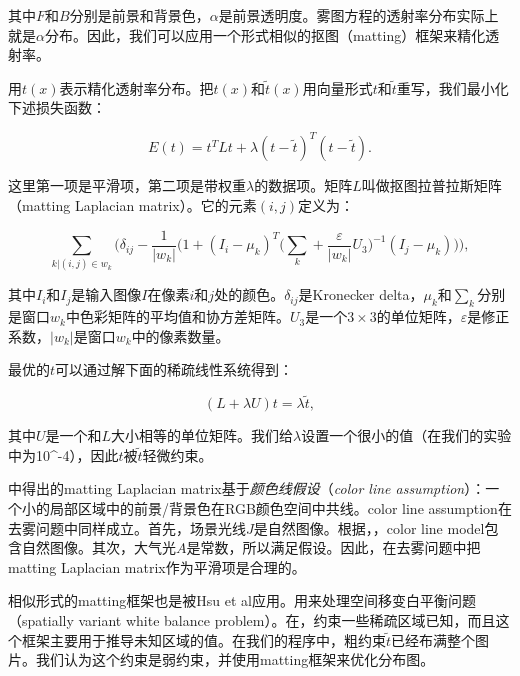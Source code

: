 \documentclass{ctexart}
\begin{document}
其中$F$和$B$分别是前景和背景色，$\alpha$是前景透明度。雾图方程的透射率分布实际上就是$\alpha$分布。因此，我们可以应用一个形式相似的抠图（matting）\cite{LevinLischinskiWeiss2006}框架来精化透射率。\par

用$t(x)$表示精化透射率分布。把$t(x)$和$\tilde{t}(x)$用向量形式$t$和$\tilde{t}$重写，我们最小化下述损失函数：

\begin{equation}\label{equ:15}
	E(t) = t^TLt + \lambda(t-\tilde{t})^T(t-\tilde{t}).
\end{equation}

这里第一项是平滑项，第二项是带权重$\lambda$的数据项。矩阵$L$叫做抠图拉普拉斯矩阵（matting Laplacian matrix）\cite{LevinLischinskiWeiss2006}。它的元素$(i, j)$定义为：

\begin{equation}\label{equ:16}
	\sum_{k | (i, j) \in w_k}\Big(
	\delta_{ij} - \frac{1}{|w_k|} \Big(
	1 + (I_i - \mu_k)^T \big(\sum_k + \frac{\varepsilon}{|w_k|}U_3\big)^{-1} (I_j - \mu_k)
	\Big)
	\Big),
\end{equation}

其中$I_i$和$I_j$是输入图像$I$在像素$i$和$j$处的颜色。$\delta_{ij}$是Kronecker delta，$\mu_k$和$\sum_k$分别是窗口$w_k$中色彩矩阵的平均值和协方差矩阵。$U_3$是一个$3 \times 3$的单位矩阵，$\varepsilon$是修正系数，$|w_k|$是窗口$w_k$中的像素数量。\par

最优的$t$可以通过解下面的稀疏线性系统得到：

\begin{equation}\label{equ:17}
	(L + \lambda U)t = \lambda \tilde{t},
\end{equation}

其中$U$是一个和$L$大小相等的单位矩阵。我们给$\lambda$设置一个很小的值（在我们的实验中为10^{-4}），因此$t$被$\tilde{t}$轻微约束。\par

\cite{LevinLischinskiWeiss2006}中得出的matting Laplacian matrix基于\emph{颜色线假设}（\emph{color line assumption}）：一个小的局部区域中的前景/背景色在RGB颜色空间中共线。color line assumption在去雾问题中同样成立。首先，场景光线$J$是自然图像。根据\cite{LevinLischinskiWeiss2006}，\cite{OmerWerman2004}，color line model包含自然图像。其次，大气光$A$是常数，所以满足假设。因此，在去雾问题中把matting Laplacian matrix作为平滑项是合理的。\par

相似形式的matting框架也是被Hsu et al应用。\cite{HsuMertensParisAvidanDurand2008}用来处理空间移变白平衡问题（spatially variant white balance problem）。在\cite{GilchristJacobsen1983}，\cite{OmerWerman2004}约束一些稀疏区域已知，而且这个框架主要用于推导未知区域的值。在我们的程序中，粗约束$\tilde{t}$已经布满整个图片。我们认为这个约束是弱约束，并使用matting框架来优化分布图。\par
\end{document}
